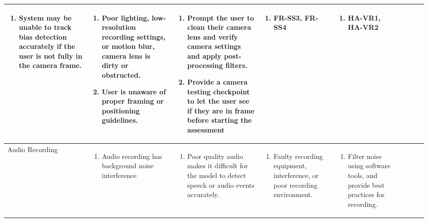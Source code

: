 \documentclass{article}
\begin{document}
\begin{landscape}
\begin{longtable}{|p{3cm}|p{3cm}|p{4cm}|p{4cm}|p{3cm}|p{2cm}|p{3cm}|}
\begin{enumerate}[leftmargin=*]
      \item System may be unable to track bias detection accurately if the user is not fully in the camera frame.
  \end{enumerate} &
  \begin{enumerate}[leftmargin=*]
       \item Poor lighting, low-resolution recording settings, or motion blur, camera lens is dirty or obstructed.
       \item User is unaware of proper framing or positioning guidelines.
  \end{enumerate} &
  \begin{enumerate}[leftmargin=*]
       \item Prompt the user to clean their camera lens and verify camera settings and apply post-processing filters.
       \item Provide a camera testing checkpoint to let the user see if they are in frame before starting the assessment
  \end{enumerate} &
  \begin{enumerate}[leftmargin=*]
       \item FR-SS3, FR-SS4
  \end{enumerate} &
  \begin{enumerate}[leftmargin=*]
       \item HA-VR1, HA-VR2
  \end{enumerate} \\
  \hline
  Audio Recording  & 
  \begin{enumerate}[leftmargin=*]
      \item Audio recording has background noise interference
  \end{enumerate} & 
  \begin{enumerate}[leftmargin=*]
      \item Poor quality audio makes it difficult for the model to detect speech or audio events accurately.
  \end{enumerate} &
  \begin{enumerate}[leftmargin=*]
       \item Faulty recording equipment, interference, or poor recording environment.
  \end{enumerate} &
  \begin{enumerate}[leftmargin=*]
       \item Filter noise using software tools, and provide best practices for recording.
  \end{enumerate} &
  \begin{enumerate}[leftmargin=*]

\end{enumerate}
\end{longtable}
\end{landscape}
\end{document}
